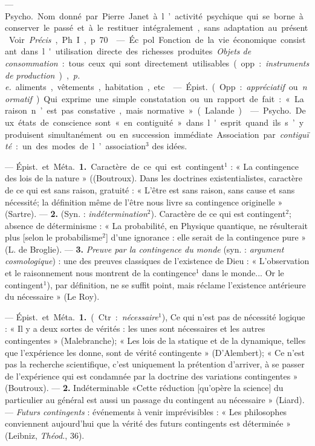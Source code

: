 \begin{itemize}[leftmargin=1cm, label=, itemsep=11pt]
 — \si{Psycho.}
Nom donné par Pierre Janet à l’activité psychique qui se borne à conserver le passé et à le restituer intégralement, sans adaptation au présent. Voir  {\it Précis}, Ph. I, p. 70.

 — Éc. pol. Fonction
de la vie économique consistant
dans l'utilisation directe des richesses produites. {\it Objets de consommation} : tous ceux qui sont directement utilisables (opp. : {\it instruments
de production}), {\it p. e.} aliments, vêtements, habitation, etc.

 — \si{Épist.} (Opp. : {\it appréciatif}
ou {\it normatif}). Qui exprime une
simple constatation ou un rapport
de fait : « La raison n’est pas constative, mais normative » (Lalande).

 — \si{Psycho.} Deux états de
conscience sont « en contiguité »
dans l'esprit quand ils s’y produisent simultanément ou en succession
immédiate. Association par {\it contiguïté} : un des modes de l’association$^3$ des idées.

 — \si{Épist.} et \si{Méta.} {\bf 1.} Caractère de ce qui est contingent$^1$ :
« La contingence des lois de la
nature » ((Boutroux). Dans les doctrines existentialistes, caractère de
ce qui est sans raison, gratuité :
« L’être est sans raison, sans cause et
sans nécessité; la définition même
de l’être nous livre sa contingence
originelle » (Sartre). — {\bf 2.} (Syn. :
{\it indétermination}$^2$). Caractère de ce
qui est contingent$^2$; absence de déterminisme : « La probabilité, en
Physique quantique, ne résulterait
plus [selon le probabilisme$^2$] d’une
ignorance : elle serait de la contingence pure » (L. de Broglie). — {\bf 3.}
{\it Preuve par la contingence du monde}
(syn. : {\it argument cosmologique}) : une
des preuves classiques de l’existence de Dieu : « L'observation et
le raisonnement nous montrent de
la contingence$^1$ dans le monde... Or
le contingent$^1$), par définition, ne se
suffit point, mais réclame l’existence antérieure du nécessaire » (Le
Roy).

 — \si{Épist.} et \si{Méta.} {\bf 1.} (Ctr. :
{\it nécessaire}$^1$), Ce qui n'est pas de nécessité logique : « Il y a deux sortes
de vérités : les unes sont nécessaires
et les autres contingentes » (Malebranche); « Les lois de la statique
et de la dynamique, telles que l’expérience les donne, sont de vérité
contingente » (D’Alembert); « Ce
n’est pas la recherche scientifique,
c’est uniquement la prétention d’arriver, à se passer de l'expérience qui
est condamnée par la doctrine des
variations contingentes » (Boutroux). — {\bf 2.} Indéterminable
«Cette réduction [qu’opère la science]
du particulier au général est aussi
un passage du contingent au nécessaire » (Liard). — {\it Futurs contingents} : événements à venir imprévisibles : « Les philosophes conviennent aujourd'hui que la vérité des
futurs contingents est déterminée »
(Leibniz, {\it Théod.}, 36).


\end{itemize}
